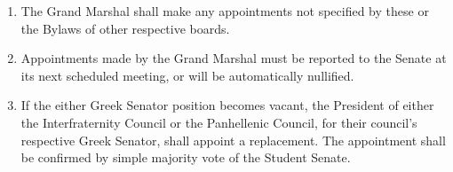 \begin{enumerate}
    \item The Grand Marshal shall make any appointments not specified by these or the Bylaws of other respective boards.

    \item Appointments made by the Grand Marshal must be reported to the Senate at its next scheduled meeting, or will be automatically nullified.

    \item If the either Greek Senator position becomes vacant, the President of either the Interfraternity Council or the Panhellenic Council, for their council's respective Greek Senator, shall appoint a replacement. The appointment shall be confirmed by simple majority vote of the Student Senate.
\end{enumerate}
